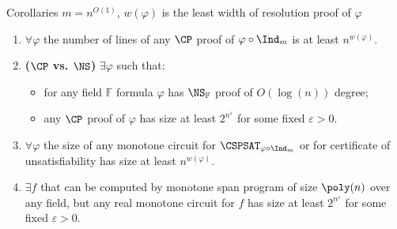 \newcommand{\ba}{{\color{blue} $\boldsymbol{\forall}$}}
\newcommand{\be}{{\color{blue} $\boldsymbol{\exists}$}}

\begin{frame}{Corollaries}
    $m = n^{O(1)}$, $w(\varphi)$ is the least width of resolution proof of $\varphi$

    \pause
    \begin{enumerate}
        \item \ba $\varphi$ the number of lines of any $\CP$ proof of $\varphi \circ \Ind_m$ is at least
            $n^{w(\varphi)}$.
        \pause
        \item \textbf{($\CP$ vs. $\NS$)} \be $\varphi$ such that:
            \begin{itemize}
                \item for any field $\mathbb{F}$ formula $\varphi$ has $\NS_{\mathbb{F}}$ proof of
                    $O(\log(n))$ degree;
                \item any $\CP$ proof of $\varphi$ has size at least $2^{n^{\varepsilon}}$ for some fixed
                    $\varepsilon > 0$.
            \end{itemize}
        \pause
        \vspace{0.4cm}    
        \item \ba $\varphi$ the size of any monotone circuit for $\CSPSAT_{\varphi \circ \Ind_m}$ or for
            certificate of unsatisfiability has size at least $n^{w(\varphi)}$.
        \pause
        \item \be $f$ that can be computed by monotone span program of size $\poly(n)$ over any field,
            but any real monotone circuit for $f$ has size at least $2^{n^{\varepsilon}}$ for some fixed
            $\varepsilon > 0$.
    \end{enumerate}
\end{frame}
